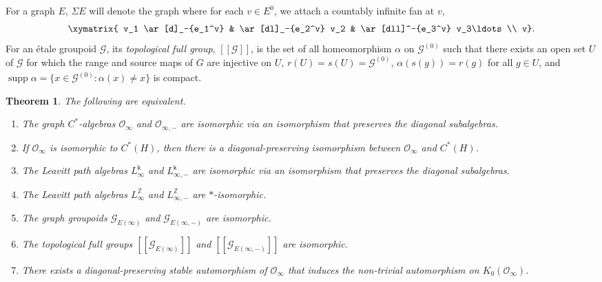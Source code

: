 \documentclass[11pt, letterpaper,final]{amsart}
\newtheorem{theoremintro}{Theorem}
\theoremstyle{definition}
\theoremstyle{remark}
\begin{document}
For a graph $E$, $\Sigma E$ will denote the graph where for each $v \in E^0$, we attach a countably infinite fan at $v$,
\[
\xymatrix{ v_1 \ar[d]_-{e_1^v} &  \ar[dl]_-{e_2^v} v_2  & \ar[dll]^-{e_3^v} v_3\ldots    \\ 
         v}.
\]
For an \'etale groupoid $\mathcal{G}$, its \emph{topological full group}, $[[\mathcal{G}]]$, is the set of all homeomorphism $\alpha$ on $\mathcal{G}^{(0)}$ such that there exists an open set $U$ of $\mathcal{G}$ for which the range and source maps of $G$ are injective on $U$, $r(U)=s(U)=\mathcal{G}^{(0)}$, $\alpha (s(g)) = r(g)$ for all $g \in U$, and $\operatorname{supp} \alpha = \overline{\{ x \in \mathcal{G}^{(0)} : \alpha(x) \neq x \} }$ is compact.

\begin{theoremintro}\label{thm-intro}
The following are equivalent.
\begin{enumerate}[label=\textbf{D.\arabic*}]
    \item \label{EF-cstar} The graph $C^*$-algebras $\mathcal{O}_\infty$ and $\mathcal{O}_{\infty,-}$ are isomorphic via an isomorphism that preserves the diagonal subalgebras.

    \item \label{cartan} If $\mathcal{O}_\infty$ is isomorphic to $C^*(H)$, then there is a diagonal-preserving isomorphism between $\mathcal{O}_\infty$ and $C^*(H)$.

    \item \label{EF-LPA} The Leavitt path algebras $L_\infty^{\mathsf{k}}$ and $L_{\infty,-}^\mathsf{k}$ are isomorphic via an isomorphism that preserves the diagonal subalgebras.

    \item \label{EF-LPA-Z} The Leavitt path algebras $L_\infty^{\mathbb{Z}}$ and $L_{\infty, -}^\mathbb{Z}$ are $*$-isomorphic.

    \item \label{EF-Groupoid} The graph groupoids $\mathcal{G}_{E(\infty)}$ and $\mathcal{G}_{E(\infty,-)}$ are isomorphic.

    \item \label{EF-fullgrps} The topological full groups $[[\mathcal{G}_{E(\infty)}]]$ and $[[\mathcal{G}_{E(\infty,-)}]]$ are isomorphic.

    \item \label{Oinfty} There exists a diagonal-preserving stable automorphism of $\mathcal{O}_\infty$ that induces the non-trivial automorphism on $K_0(\mathcal{O}_\infty)$.


\end{enumerate}
\end{theoremintro}
\end{document}
